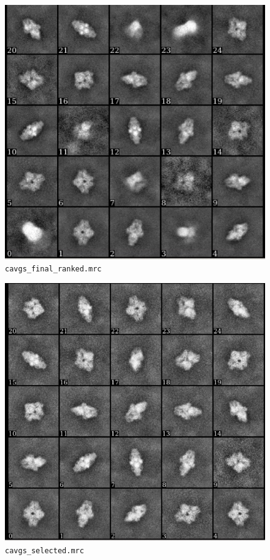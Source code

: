 \documentclass[a4paper,11pt]{article}
\begin{document}
\begin{figure}
\includegraphics[keepaspectratio=true,scale=0.8]{./bgal/bgal_cavgs}
\caption{\texttt{cavgs\_final\_ranked.mrc}}
\end{figure}
\begin{figure}
\includegraphics[keepaspectratio=true,scale=0.8]{./bgal/bgal_cavgs_sel}
\caption{\texttt{cavgs\_selected.mrc}}
\end{figure}
\end{document}
